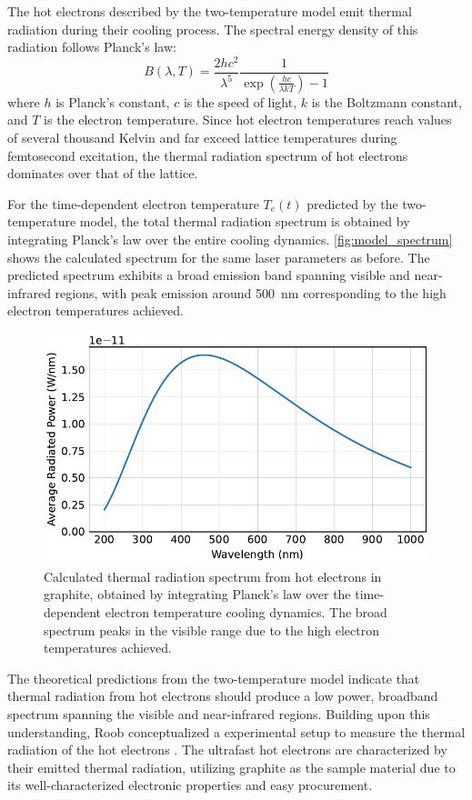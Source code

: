 \documentclass[
	parskip=half,
	a4paper,
]{scrarticle}
\begin{document}
The hot electrons described by the two-temperature model emit thermal radiation during their cooling process. The spectral energy density of this radiation follows Planck's law:
\begin{equation}
B(\lambda, T) = \frac{2hc^2}{\lambda^5} \frac{1}{\exp\left(\frac{hc}{\lambda kT}\right) - 1}
\end{equation}
where $h$ is Planck's constant, $c$ is the speed of light, $k$ is the Boltzmann constant, and $T$ is the electron temperature. Since hot electron temperatures reach values of several thousand Kelvin and far exceed lattice temperatures during femtosecond excitation, the thermal radiation spectrum of hot electrons dominates over that of the lattice. 

For the time-dependent electron temperature $T_e(t)$ predicted by the two-temperature model, the total thermal radiation spectrum is obtained by integrating Planck's law over the entire cooling dynamics. \autoref{fig:model_spectrum} shows the calculated spectrum for the same laser parameters as before. The predicted spectrum exhibits a broad emission band spanning visible and near-infrared regions, with peak emission around \SI{500}{nm} corresponding to the high electron temperatures achieved.
\begin{figure}[b]
    \centering
    \includegraphics{../analysis/figures/model spectrum.pdf}
    \caption{Calculated thermal radiation spectrum from hot electrons in graphite, obtained by integrating Planck's law over the time-dependent electron temperature cooling dynamics. The broad spectrum peaks in the visible range due to the high electron temperatures achieved.}
    \label{fig:model_spectrum}
\end{figure}

The theoretical predictions from the two-temperature model indicate that thermal radiation from hot electrons should produce a low power, broadband spectrum spanning the visible and near-infrared regions. Building upon this understanding, Roob conceptualized a experimental setup to measure the thermal radiation of the hot electrons \cite{roob_thermal_2025}. The ultrafast hot electrons are characterized by their emitted thermal radiation, utilizing graphite as the sample material due to its well-characterized electronic properties \cite{nihira_temperature_2003} and easy procurement.
\end{document}
